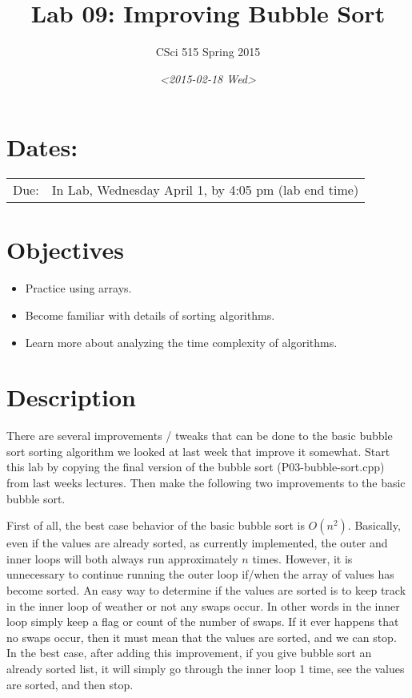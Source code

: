\documentclass[11pt]{article}
\author{CSci 515 Spring 2015}
\date{\textit{<2015-02-18 Wed>}}
\title{Lab 09: Improving Bubble Sort}
\begin{document}
\maketitle

\section*{Dates:}
\label{sec-1}
\begin{center}
\begin{tabular}{ll}
Due: & In Lab, Wednesday April 1, by 4:05 pm (lab end time)\\
\end{tabular}
\end{center}
\section*{Objectives}
\label{sec-2}
\begin{itemize}
\item Practice using arrays.
\item Become familiar with details of sorting algorithms.
\item Learn more about analyzing the time complexity of algorithms.
\end{itemize}
\section*{Description}
\label{sec-3}
There are several improvements / tweaks that can be done to the basic
bubble sort sorting algorithm we looked at last week that improve it
somewhat.  Start this lab by copying the final version of the bubble
sort (P03-bubble-sort.cpp) from last weeks lectures.  Then make the
following two improvements to the basic bubble sort.

First of all, the best case behavior of the basic bubble sort is
$O(n^2)$.  Basically, even if the values are already sorted, as
currently implemented, the outer and inner loops will both always run
approximately $n$ times.  However, it is unnecessary to continue
running the outer loop if/when the array of values has become sorted.
An easy way to determine if the values are sorted is to keep track in
the inner loop of weather or not any swaps occur.  In other words in
the inner loop simply keep a flag or count of the number of swaps.  If
it ever happens that no swaps occur, then it must mean that the values
are sorted, and we can stop.  In the best case, after adding this
improvement, if you give bubble sort an already sorted list, it will
simply go through the inner loop 1 time, see the values are sorted,
and then stop.
\end{document}
